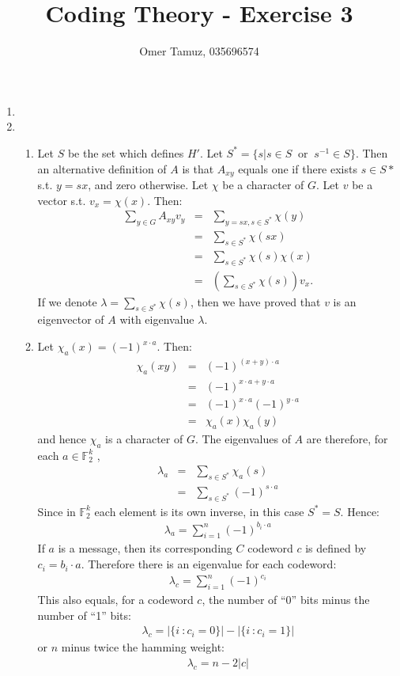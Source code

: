 \documentclass[11pt]{article} \usepackage{amssymb}
\begin{document}
\title{Coding Theory - Exercise 3}

 \author{Omer Tamuz, 035696574}
\maketitle

\begin{enumerate}
\item 
\item
  \begin{enumerate}
  \item 
  Let $S$ be the set which defines $H'$. Let 
  $S^*=\{s|s\in S\;\;\mbox{or}\;\;s^{-1}\in S\}$. 
  Then an alternative definition of $A$ is that 
  $A_{xy}$ equals one if there exists
  $s\in S*$ s.t. $y=sx$, and zero otherwise. Let $\chi$
  be a character of $G$. Let $v$ be a vector s.t. $v_x=\chi(x)$. Then:
  \begin{eqnarray*}
      \sum_{y\in G}A_{xy}v_y&=&\sum_{y=sx,s\in S^*}\chi(y)
    \\ &=&\sum_{s\in S^*}\chi(sx)
    \\ &=&\sum_{s\in S^*}\chi(s)\chi(x)
    \\ &=&\left(\sum_{s\in S^*}\chi(s)\right)v_x.
  \end{eqnarray*}
  If we denote $\lambda = \sum_{s\in S^*}\chi(s)$, then
  we have proved that $v$ is an eigenvector of $A$ with eigenvalue $\lambda$.
  \item
  Let $\chi_a(x)=(-1)^{x\cdot a}$. Then:
  \begin{eqnarray*}
    \chi_a(xy)&=&(-1)^{(x+y)\cdot a}
    \\ &=& (-1)^{x\cdot a+y\cdot a}
    \\ &=& (-1)^{x\cdot a}(-1)^{y\cdot a}
    \\ &=& \chi_a(x)\chi_a(y)
  \end{eqnarray*}
  and hence $\chi_a$ is a character of $G$. The eigenvalues of $A$ are therefore,
  for each $a\in \mathbb{F}_2^k$ , 
  \begin{eqnarray*}
    \lambda_a&=&\sum_{s\in S^*}\chi_a(s)
    \\ &=& \sum_{s\in S^*}(-1)^{s\cdot a}
  \end{eqnarray*}
  Since in $\mathbb{F}_2^k$ each element is its own inverse, in this case $S^*=S$. Hence:
  \begin{eqnarray*}
    \lambda_a=\sum_{i=1}^n(-1)^{b_i\cdot a}
  \end{eqnarray*}
  If $a$ is a message, then its corresponding $C$ codeword $c$ is defined
  by $c_i=b_i\cdot a$. Therefore there is an eigenvalue for each codeword:
  \begin{eqnarray*}
    \lambda_c=\sum_{i=1}^n(-1)^{c_i}
  \end{eqnarray*}
  This also equals, for a codeword $c$, the number of ``0'' bits minus 
  the number of ``1'' bits:
  \begin{eqnarray*}
    \lambda_c=|\{i\::c_i=0\}|-|\{i\::c_i=1\}|
  \end{eqnarray*}
  or $n$ minus twice the hamming weight:
  \begin{eqnarray*}
    \lambda_c=n-2|c|
  \end{eqnarray*}


\end{enumerate}
\end{enumerate}
\end{document}
